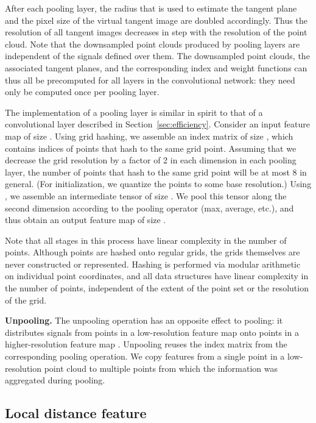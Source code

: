 \documentclass[10pt,twocolumn,letterpaper]{article}
\newcommand\mypara[1]{\vspace{1mm}\noindent\textbf{#1}}
\begin{document}
After each pooling layer, the radius  that is used to estimate the tangent plane and the pixel size of the virtual tangent image are doubled accordingly. Thus the resolution of all tangent images decreases in step with the resolution of the point cloud. Note that the downsampled point clouds produced by pooling layers are independent of the signals defined over them. The downsampled point clouds, the associated tangent planes, and the corresponding index and weight functions can thus all be precomputed for all layers in the convolutional network: they need only be computed once per pooling layer.

The implementation of a pooling layer is similar in spirit to that of a convolutional layer described in Section~\ref{sec:efficiency}.
Consider an input feature map  of size .
Using grid hashing, we assemble an index matrix  of size , which contains indices of points that hash to the same grid point. Assuming that we decrease the grid resolution by a factor of 2 in each dimension in each pooling layer, the number of points that hash to the same grid point will be at most 8 in general. (For initialization, we quantize the points to some base resolution.)
Using , we assemble an intermediate tensor of size .
We pool this tensor along the second dimension according to the pooling operator (max, average, etc.), and thus obtain an output feature map  of size .

Note that all stages in this process have linear complexity in the number of points. Although points are hashed onto regular grids, the grids themselves are never constructed or represented. Hashing is performed via modular arithmetic on individual point coordinates, and all data structures have linear complexity in the number of points, independent of the extent of the point set or the resolution of the grid.


\mypara{Unpooling.}
The unpooling operation has an opposite effect to pooling: it distributes signals from points in a low-resolution feature map  onto points in a higher-resolution feature map . Unpooling reuses the index matrix from the corresponding pooling operation. We copy features from a single point in a low-resolution point cloud to multiple points from which the information was aggregated during pooling.


\subsection{Local distance feature}
\end{document}
